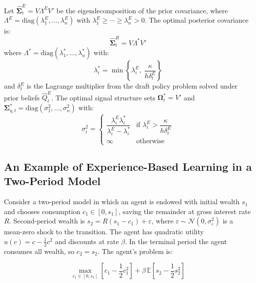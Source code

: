 \begin{proposition}
    Let $\hat{\boldsymbol{\Sigma}}^E_t = V \Lambda^E V'$ be the eigendecomposition of the prior covariance, where $\Lambda^E = \mathrm{diag}(\lambda_1^E, \ldots, \lambda_n^E)$ with $\lambda_1^E \geq \cdots \geq \lambda_n^E > 0$. The optimal posterior covariance is:
    \begin{equation}
        \hat{\boldsymbol{\Sigma}}^R_t = V \Lambda^* V'
    \end{equation}
    where $\Lambda^* = \mathrm{diag}(\lambda_1^*, \ldots, \lambda_n^*)$ with:
    \begin{equation}
        \lambda_i^* = \min\left\{ \lambda_i^E, \; \frac{\kappa}{h \delta^E_t} \right\}
    \end{equation}
    and $\delta^E_t$ is the Lagrange multiplier from the draft policy problem solved under prior beliefs $\hat{Q}^E_t$. The optimal signal structure sets $\boldsymbol{\Omega}^*_t = V'$ and $\boldsymbol{\Sigma}^*_{\eta,t} = \mathrm{diag}(\sigma_1^2, \ldots, \sigma_n^2)$ with:
    \begin{equation}
        \sigma_i^2 = \begin{cases} 
            \dfrac{\lambda_i^E \lambda_i^*}{\lambda_i^E - \lambda_i^*} & \text{if } \lambda_i^E > \dfrac{\kappa}{h\delta^E_t} \\[2ex]
            \infty & \text{otherwise}
        \end{cases}
    \end{equation}
\end{proposition}

\subsection{An Example of Experience-Based Learning in a Two-Period Model} \label{app:two_period_example}

Consider a two-period model in which an agent is endowed with initial wealth $s_1$ and 
chooses consumption $c_1 \in [0, s_1]$, saving the remainder at gross interest rate $R$.
Second-period wealth is $s_2 = R(s_1 - c_1) + \varepsilon$, where
$\varepsilon \sim \mathcal{N}(0, \sigma_\varepsilon^2)$ is a mean-zero shock to the 
transition. The agent has quadratic utility $u(c) = c - \frac{1}{2}c^2$ and
discounts at rate $\beta$. In the terminal period the agent 
consumes all wealth, so $c_2 = s_2$. The agent's problem is:

\begin{equation}
    \max_{c_1 \in [0, s_1]} \left[c_1 - \frac{1}{2}c_1^2\right]
    + \beta \, \mathbb{E}\left[s_2 - \frac{1}{2}s_2^2\right]
\end{equation}

